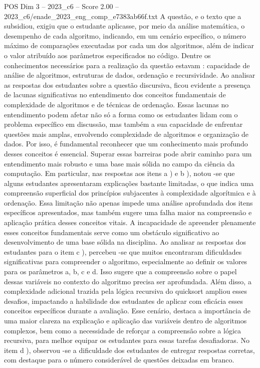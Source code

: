 \begin{textsample}{POS Dim 3 – 2023\_c6 – Score 2.00 – 2023\_c6/enade\_2023\_eng\_comp\_e7383ab66f.txt}
A questão, e o texto que a subsidiou, exigiu que o estudante aplicasse, por meio da análise matemática, o desempenho de cada algoritmo, indicando, em um cenário específico, o número máximo de comparações executadas por cada um dos algoritmos, além de indicar o valor atribuído aos parâmetros especificados no código.
Dentre os conhecimentos necessários para a realização da questão estavam : capacidade de análise de algoritmos, estruturas de dados, ordenação e recursividade.
Ao analisar as respostas dos estudantes sobre a questão discursiva, ficou evidente a presença de lacunas significativas no entendimento dos conceitos fundamentais de complexidade de algoritmos e de técnicas de ordenação.
Essas lacunas no entendimento podem afetar não só a forma como os estudantes lidam com o problema específico em discussão, mas também a sua capacidade de enfrentar questões mais amplas, envolvendo complexidade de algoritmos e organização de dados.
Por isso, é fundamental reconhecer que um conhecimento mais profundo desses conceitos é essencial.
Superar essas barreiras pode abrir caminho para um entendimento mais robusto e uma base mais sólida no campo da ciência da computação.
Em particular, nas respostas aos itens a ) e b ), notou -se que alguns estudantes apresentaram explicações bastante limitadas, o que indica uma compreensão superficial dos princípios subjacentes à complexidade algorítmica e à ordenação.
Essa limitação não apenas impede uma análise aprofundada dos itens específicos apresentados, mas também sugere uma falha maior na compreensão e aplicação prática desses conceitos vitais.
A incapacidade de apreender plenamente esses conceitos fundamentais serve como um obstáculo significativo ao desenvolvimento de uma base sólida na disciplina.
Ao analisar as respostas dos estudantes para o item c ), percebeu -se que muitos encontraram dificuldades significativas para compreender o algoritmo, especialmente ao definir os valores para os parâmetros a, b, c e d.
Isso sugere que a compreensão sobre o papel dessas variáveis no contexto do algoritmo precisa ser aprofundada.
Além disso, a complexidade adicional trazida pela lógica recursiva do quicksort ampliou esses desafios, impactando a habilidade dos estudantes de aplicar com eficácia esses conceitos específicos durante a avaliação.
Esse cenário, destaca a importância de uma maior clareza na explicação e aplicação das variáveis dentro de algoritmos complexos, bem como a necessidade de reforçar a compreensão sobre a lógica recursiva, para melhor equipar os estudantes para essas tarefas desafiadoras.
No item d ), observou -se a dificuldade dos estudantes de entregar respostas corretas, com destaque para o número considerável de questões deixadas em branco.

\end{textsample}
